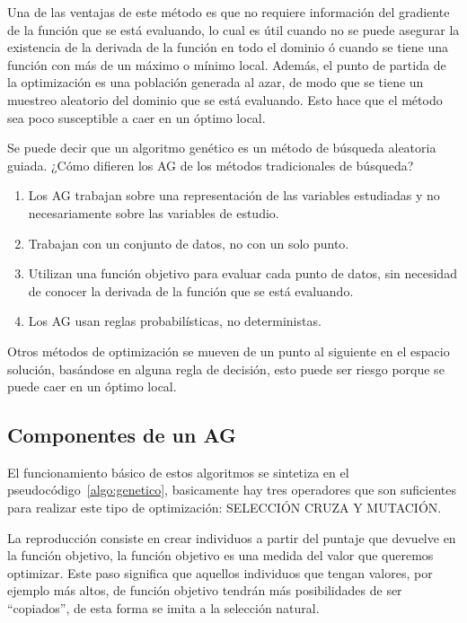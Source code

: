 Una de las ventajas de este método es que no requiere información del gradiente
de la función que se está evaluando, lo cual es útil cuando no se puede asegurar
la existencia de la derivada de la función en todo el dominio ó cuando se tiene
una función con más de un máximo o mínimo local.
%
Además, el punto de partida de la optimización es una población generada al
azar, de modo que se tiene un muestreo aleatorio del dominio que se está
evaluando.
%
Esto hace que el método sea poco susceptible a caer en un óptimo local.

Se puede decir que un algoritmo genético es un método de búsqueda aleatoria
guiada.
%
¿Cómo difieren los AG de los métodos tradicionales de búsqueda?
%
\begin{enumerate}
  \item Los AG trabajan sobre una representación de las variables estudiadas y
    no necesariamente sobre las variables de estudio.
    \item Trabajan con un conjunto de datos, no con un solo punto.
    \item Utilizan una función objetivo para evaluar cada punto de datos, sin
      necesidad de conocer la derivada de la función que se está evaluando.
    \item Los AG usan reglas probabilísticas, no deterministas.
\end{enumerate}

Otros métodos de optimización se mueven de un punto al siguiente en el espacio
solución, basándose en alguna regla de decisión, esto puede ser riesgo porque se
puede caer en un óptimo local.
%

\subsection{Componentes de un AG}
%
El funcionamiento básico de estos algoritmos se sintetiza en el
pseudocódigo~\ref{algo:genetico}, basicamente hay tres operadores que son
suficientes para realizar este tipo de optimización: SELECCIÓN CRUZA Y MUTACIÓN.


La reproducción consiste en crear individuos a partir del puntaje que devuelve
en la función objetivo, la función objetivo es una medida del valor que
queremos optimizar.
%
Este paso significa que aquellos individuos que tengan valores, por ejemplo más
altos, de función objetivo tendrán más posibilidades de ser ``copiados'', de esta
forma se imita a la selección natural.

